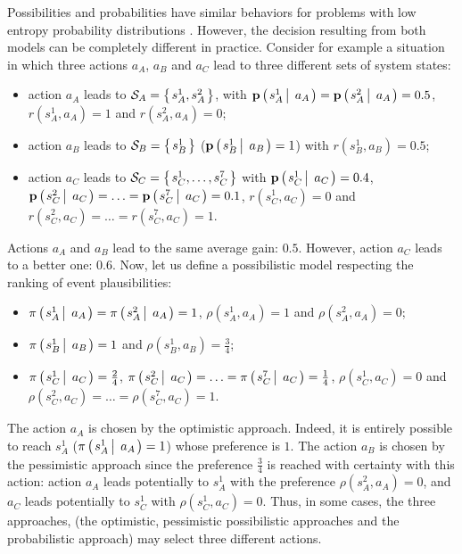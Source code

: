 Possibilities and probabilities have similar behaviors for problems with low
entropy probability distributions \cite{Dubois04probability-possibilitytransformations}.
However, the decision resulting from both models 
can be completely different in practice.
Consider for example a situation in which
three actions $a_A$, $a_B$ and $a_C$ 
lead to three different sets of system states:
\begin{itemize}
\item action $a_A$ leads to $\mathcal{S}_A = \left\{ \left. s_A^1,s_A^2 \right. \right\}$, with
$\textbf{p} \left( \left.  s_A^1 \, \right| \left. \, a_A  \right. \right) = \textbf{p} \left( \left.  s_A^2 \, \right| \left. \, a_A  \right. \right) = 0.5$,
$r(s_A^1,a_A) = 1$ and $r(s_A^2,a_A) = 0$;
\item action $a_B$ leads to $\mathcal{S}_B = \left\{ \left. s_B^1 \right. \right\}$ 
($\textbf{p} \left( \left.  s_B^1 \, \right| \left. \, a_B  \right. \right) = 1$)
with $r(s_B^1,a_B) = 0.5$;
\item action $a_C$ leads to $\mathcal{S}_C = \left\{ \left. s_C^1,\ldots,s_C^7  \right. \right\}$
with $\textbf{p} \left( \left.  s_C^1 \, \right| \left. \, a_C  \right. \right)=0.4$,
$\textbf{p} \left( \left.  s_C^2 \, \right| \left. \, a_C  \right. \right)
= \ldots
= \textbf{p} \left( \left.  s_C^7 \, \right| \left. \, a_C  \right. \right) = 0.1$,
$r(s_C^1,a_C) = 0$ 
and $r(s_C^2,a_C)=\ldots=r(s_C^7,a_C) = 1$.
\end{itemize}
Actions $a_A$ and $a_B$ lead to the same average gain: $0.5$.
However, action $a_C$ leads to a better one: $0.6$.
Now, let us define a possibilistic model respecting the ranking of event plausibilities: 
\begin{itemize}
\item $\pi \left( \left.  s_A^1 \, \right| \left. \, a_A  \right. \right) = \pi \left( \left.  s_A^2 \, \right| \left. \, a_A  \right. \right) = 1$,
$\rho(s_A^1,a_A) = 1$ and $\rho(s_A^2,a_A) = 0$;
\item $\pi \left( \left.  s_B^1 \, \right| \left. \, a_B  \right. \right) = 1$ and $\rho(s_B^1,a_B) = \frac{3}{4}$;
\item $\pi \left( \left.  s_C^1 \, \right| \left. \, a_C  \right. \right)=\frac{2}{4}$,
$\pi \left( \left.  s_C^2 \, \right| \left. \, a_C  \right. \right)
= \ldots
= \pi \left( \left.  s_C^7 \, \right| \left. \, a_C  \right. \right) = \frac{1}{4}$,
$\rho(s_C^1,a_C) = 0$ 
and $\rho(s_C^2,a_C)=\ldots=\rho(s_C^7,a_C) = 1$.
\end{itemize}
The action $a_A$ is chosen by the optimistic approach.
Indeed, it is entirely possible to reach $s_A^1$
($\pi \left( \left.  s_A^1 \, \right| \left. \, a_A  \right. \right) = 1$)
whose preference is $1$.
The action $a_B$ is chosen by the pessimistic approach
since the preference $\frac{3}{4}$ is reached with certainty
with this action:
action $a_A$ leads potentially to $s_A^1$ with the preference 
$\rho(s_A^2,a_A)=0$, and $a_C$ leads potentially to $s_C^1$
with $\rho(s_C^1,a_C) = 0$.
Thus, in some cases, 
the three approaches, (the optimistic, pessimistic possibilistic approaches 
and the probabilistic approach) 
may select three different actions.

